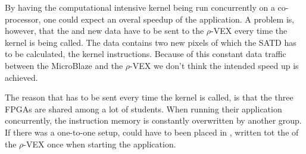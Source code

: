 By having the computational intensive kernel being run concurrently on a co-processor, one could expect an overal speedup of the application. A problem is, however, that the  and new data have to be sent to the $\rho$-VEX every time the kernel is being called. The data contains two new pixels of which the SATD has to be calculated,  the kernel instructions. Because of this constant data traffic between the MicroBlaze and the $\rho$-VEX we don't think the intended speed up is achieved.


The reason that  has to be sent every time the kernel is called, is that the three FPGAs are shared among a lot of students. When running their application concurrently, the instruction memory is constantly overwritten by another group. If there was a one-to-one setup,  could have to been placed in , written tot the  of the $\rho$-VEX once when starting the application. 


